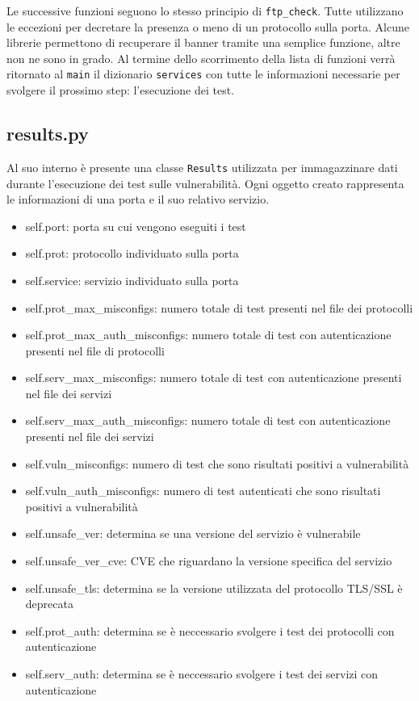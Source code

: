 \documentclass[12pt]{report}
\begin{document}
Le successive funzioni seguono lo stesso principio di \lstinline{ftp_check}. Tutte utilizzano le eccezioni per decretare la presenza o meno di un protocollo sulla porta. Alcune librerie permettono di recuperare il banner tramite una semplice funzione, altre non ne sono in grado. Al termine dello scorrimento della lista di funzioni verrà ritornato al \lstinline{main} il dizionario \lstinline{services} con tutte le informazioni necessarie per svolgere il prossimo step: l'esecuzione dei test.

\subsection{results.py}

Al suo interno è presente una classe \lstinline{Results} utilizzata per immagazzinare dati durante l'esecuzione dei test sulle vulnerabilità. Ogni oggetto creato rappresenta le informazioni di una porta e il suo relativo servizio.

\begin{itemize}
    \item self.port: porta su cui vengono eseguiti i test
    \item self.prot: protocollo individuato sulla porta
    \item self.service: servizio individuato sulla porta
    \item self.prot\_max\_misconfigs: numero totale di test presenti nel file dei protocolli
    \item self.prot\_max\_auth\_misconfigs: numero totale di test con autenticazione presenti nel file di protocolli
    \item self.serv\_max\_misconfigs: numero totale di test con autenticazione presenti nel file dei servizi
    \item self.serv\_max\_auth\_misconfigs: numero totale di test con autenticazione presenti nel file dei servizi
    \item self.vuln\_misconfigs: numero di test che sono risultati positivi a vulnerabilità
    \item self.vuln\_auth\_misconfigs: numero di test autenticati che sono risultati positivi a vulnerabilità
    \item self.unsafe\_ver: determina se una versione del servizio è vulnerabile
    \item self.unsafe\_ver\_cve: CVE che riguardano la versione specifica del servizio
    \item self.unsafe\_tls: determina se la versione utilizzata del protocollo TLS/SSL è deprecata
    \item self.prot\_auth: determina se è neccessario svolgere i test dei protocolli con autenticazione 
    \item self.serv\_auth: determina se è neccessario svolgere i test dei servizi con autenticazione 
\end{itemize}
\end{document}

